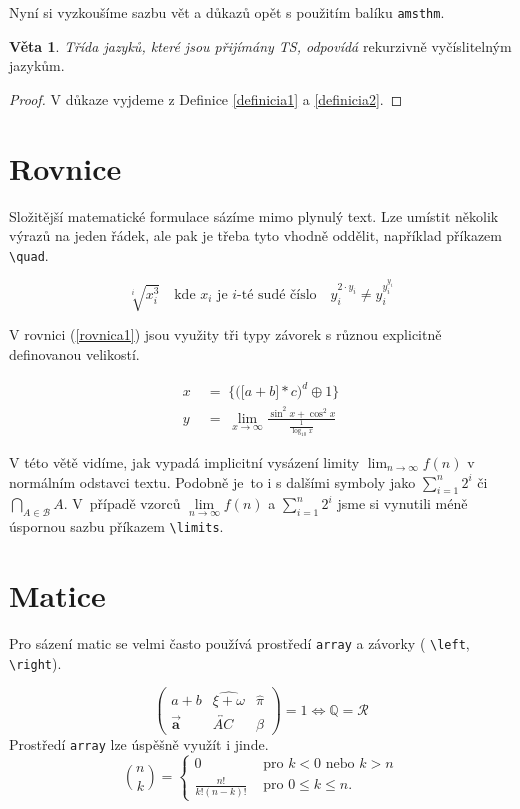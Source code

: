 \documentclass[a4paper, 11pt, twocolumn, hidelinks]{article}
\theoremstyle{definition}
\newtheorem{sentence}{Věta}
\begin{document}
Nyní si vyzkoušíme sazbu vět a důkazů opět s použitím balíku \texttt{amsthm}.

\begin{sentence}
\emph{Třída jazyků, které jsou přijímány TS, odpovídá} rekurzivně vyčíslitelným jazykům.
\end{sentence}

\begin{proof}
V důkaze vyjdeme z Definice \ref{definicia1} a \ref{definicia2}.
\end{proof}

\section{Rovnice}
Složitější matematické formulace sázíme mimo plynulý text. Lze umístit několik výrazů na jeden řádek, ale pak je třeba tyto vhodně oddělit, například příkazem \verb|\quad|.

$$\sqrt[i]{x_{i}^{3}} \quad \text{kde $x_{i}$ je $i$-té sudé číslo} \quad y_{i}^{2 \cdot y_{i}} \neq y_{i}^{y_{i}^{y_{i}}} $$

V rovnici (\ref{rovnica1}) jsou využity tři typy závorek s různou explicitně definovanou velikostí.

\begin{align}
\label{rovnica1} x\; &=\; \bigg\{\Big(\big[a+b\big] * c\Big)^{d} \oplus 1\bigg\} \\
\label{rovnica2} y\; &=\; \lim _{x \rightarrow \infty} \frac{\sin ^{2} x+\cos ^{2} x}{\frac{1}{\log _{10} x}}
\end{align}

V této větě vidíme, jak vypadá implicitní vysázení li\-mity $\lim _{n \rightarrow \infty} f(n)$ v normálním odstavci textu. Podobně je~to i s dalšími symboly jako $\sum_{i=1}^{n} 2^{i}$ či $\bigcap_{A \in \mathcal{B}} A$. V~pří\-padě vzorců $\lim\limits _{n \rightarrow \infty} f(n)$ a $\sum\limits_{i=1}^{n} 2^{i}$ jsme si vynutili méně \mbox{úspornou} sazbu příkazem \verb|\limits|.

\section{Matice}

Pro sázení matic se velmi často používá prostředí \texttt{array} a závorky ( \verb|\left|,  \verb|\right|).

$$\left(
\begin{array}{ccc}
a+b & \widehat{\xi+\omega} & \hat{\pi} \\
\vec{\mathbf{a}} & \overleftrightarrow{AC} & \beta
\end{array}\right)
=1 \Longleftrightarrow \mathbb{Q}=\mathcal{R}$$
Prostředí \texttt{array} lze úspěšně využít i jinde.
$$
\binom{n}{k}
=\left\{\begin{array}{cl}
0 & \text { pro } k<0 \text { nebo } k>n \\
\frac{n !}{k !(n-k) !} & \text { pro } 0 \leq k \leq n.
\end{array}\right.$$
\end{document}
